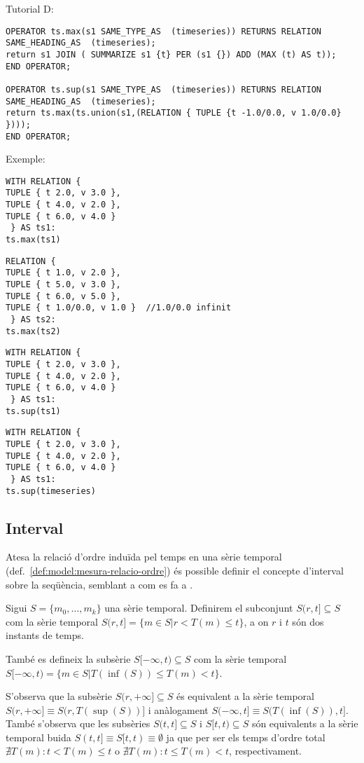Tutorial D:
\begin{verbatim}
OPERATOR ts.max(s1 SAME_TYPE_AS  (timeseries)) RETURNS RELATION SAME_HEADING_AS  (timeseries);
return s1 JOIN ( SUMMARIZE s1 {t} PER (s1 {}) ADD (MAX (t) AS t));
END OPERATOR;

OPERATOR ts.sup(s1 SAME_TYPE_AS  (timeseries)) RETURNS RELATION SAME_HEADING_AS  (timeseries);
return ts.max(ts.union(s1,(RELATION { TUPLE {t -1.0/0.0, v 1.0/0.0} })));
END OPERATOR;
\end{verbatim}



Exemple:
\begin{verbatim}
WITH RELATION {
TUPLE { t 2.0, v 3.0 },
TUPLE { t 4.0, v 2.0 },
TUPLE { t 6.0, v 4.0 }
 } AS ts1: 
ts.max(ts1)
\end{verbatim}
\begin{verbatim}
RELATION {
TUPLE { t 1.0, v 2.0 },
TUPLE { t 5.0, v 3.0 },
TUPLE { t 6.0, v 5.0 },
TUPLE { t 1.0/0.0, v 1.0 }  //1.0/0.0 infinit
 } AS ts2: 
ts.max(ts2)
\end{verbatim}
\begin{verbatim}
WITH RELATION {
TUPLE { t 2.0, v 3.0 },
TUPLE { t 4.0, v 2.0 },
TUPLE { t 6.0, v 4.0 }
 } AS ts1: 
ts.sup(ts1)
\end{verbatim}
\begin{verbatim}
WITH RELATION {
TUPLE { t 2.0, v 3.0 },
TUPLE { t 4.0, v 2.0 },
TUPLE { t 6.0, v 4.0 }
 } AS ts1: 
ts.sup(timeseries)
\end{verbatim}



\subsection{Interval}

Atesa la relació d'ordre induïda pel temps en una sèrie temporal
(def.\ \ref{def:model:mesura-relacio-ordre}) és possible definir el
concepte d'interval sobre la seqüència, semblant a com es fa a \cite{last:keogh,last:hetland}.

\begin{definition}[Interval]
  \label{def:model:st-interval}
  Sigui $S=\{m_0, \ldots, m_k\}$ una sèrie temporal. Definirem el subconjunt
  $S(r,t] \subseteq S$ com la sèrie temporal $S(r,t]=\{m\in S
  | r<T(m)\leq t\}$, a on $r$ i $t$ són dos instants de temps.

  També es defineix la subsèrie $S[-\infty,t)\subseteq S$ com la sèrie
  temporal $S[-\infty,t) = \{m\in S | T(\inf(S))\leq T(m) < t\}$.
\end{definition}
S'observa que la subsèrie $S(r,+\infty]\subseteq S$ és
equivalent a la sèrie temporal $S(r,+\infty] \equiv S(r,T(\sup(S))]$ i
anàlogament $S(-\infty,t] \equiv S(T(\inf(S)),t]$. També s'observa que les subsèries $S(t,t]\subseteq S$ i $S[t,t)\subseteq S$ són equivalents a la sèrie temporal buida $S(t,t] \equiv S[t,t) \equiv \emptyset$ ja que per ser els temps d'ordre total $\nexists T(m): t < T(m) \leq t$ o $\nexists T(m): t \leq T(m) < t$, respectivament. 


